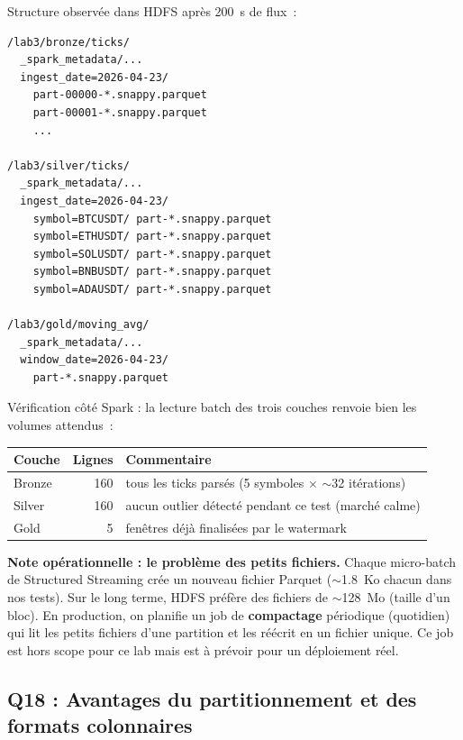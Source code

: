 \documentclass{RapportINPTCLOUD}
\begin{document}
Structure observ\'{e}e dans HDFS apr\`{e}s 200~s de flux~:

\begin{lstlisting}[style=code]
/lab3/bronze/ticks/
  _spark_metadata/...
  ingest_date=2026-04-23/
    part-00000-*.snappy.parquet
    part-00001-*.snappy.parquet
    ...

/lab3/silver/ticks/
  _spark_metadata/...
  ingest_date=2026-04-23/
    symbol=BTCUSDT/ part-*.snappy.parquet
    symbol=ETHUSDT/ part-*.snappy.parquet
    symbol=SOLUSDT/ part-*.snappy.parquet
    symbol=BNBUSDT/ part-*.snappy.parquet
    symbol=ADAUSDT/ part-*.snappy.parquet

/lab3/gold/moving_avg/
  _spark_metadata/...
  window_date=2026-04-23/
    part-*.snappy.parquet
\end{lstlisting}

V\'{e}rification c\^{o}t\'{e} Spark : la lecture batch des trois couches renvoie bien les volumes attendus~:
\begin{center}
\begin{tabular}{|l|r|l|}
\hline
\textbf{Couche} & \textbf{Lignes} & \textbf{Commentaire} \\
\hline
Bronze & 160 & tous les ticks parsés (5 symboles $\times$ $\sim$32 it\'{e}rations) \\
Silver & 160 & aucun outlier d\'{e}tect\'{e} pendant ce test (march\'{e} calme) \\
Gold & 5 & fen\^{e}tres d\'{e}j\`{a} finalis\'{e}es par le watermark \\
\hline
\end{tabular}
\end{center}

\textbf{Note op\'{e}rationnelle : le probl\`{e}me des petits fichiers.} Chaque micro-batch de Structured Streaming cr\'{e}e un nouveau fichier Parquet ($\sim$1.8~Ko chacun dans nos tests). Sur le long terme, HDFS pr\'{e}f\`{e}re des fichiers de $\sim$128~Mo (taille d'un bloc). En production, on planifie un job de \textbf{compactage} p\'{e}riodique (quotidien) qui lit les petits fichiers d'une partition et les r\'{e}\'{e}crit en un fichier unique. Ce job est hors scope pour ce lab mais est \`{a} pr\'{e}voir pour un d\'{e}ploiement r\'{e}el.

\subsection{Q18 : Avantages du partitionnement et des formats colonnaires}
\end{document}
